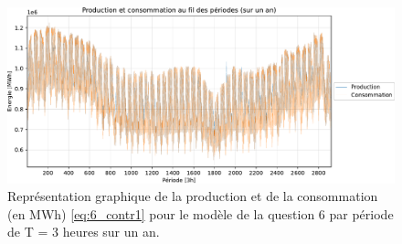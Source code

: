 \documentclass{article}
\begin{document}
\begin{figure}[H]
    \centering
    \includegraphics[scale=0.6]{GraphesP2/Prod_Cons_Q6.pdf}
    \caption{Représentation graphique de la production et de la consommation (en MWh) 
    \eqref{eq:6_contr1} pour le modèle de la question 6 par période de T = 3 heures sur un an.} 
    \label{fig:Q63}
\end{figure}
\end{document}
